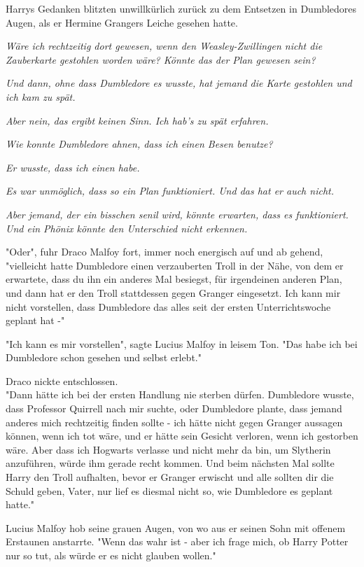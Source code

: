 {Harrys Gedanken blitzten unwillkürlich zurück zu dem Entsetzen in Dumbledores Augen, als er Hermine Grangers Leiche gesehen hatte.

\emph{Wäre ich rechtzeitig dort gewesen, wenn den Weasley-Zwillingen nicht die Zauberkarte gestohlen worden wäre? Könnte das der Plan gewesen sein?}

\emph{Und dann, ohne dass Dumbledore es wusste, hat jemand die Karte gestohlen und ich kam zu spät.}

\emph{Aber nein, das ergibt keinen Sinn. Ich hab's zu spät erfahren.}

\emph{Wie konnte Dumbledore ahnen, dass ich einen Besen benutze?}

\emph{Er wusste, dass ich einen habe.}

\emph{Es war unmöglich, dass so ein Plan funktioniert. Und das hat er auch nicht.}

\emph{Aber jemand, der ein bisschen senil wird, könnte erwarten, dass es funktioniert.}\\ \emph{Und ein Phönix könnte den Unterschied nicht erkennen.}

"Oder", fuhr Draco Malfoy fort, immer noch energisch auf und ab gehend, "vielleicht hatte Dumbledore einen verzauberten Troll in der Nähe, von dem er erwartete, dass du ihn ein anderes Mal besiegst, für irgendeinen anderen Plan, und dann hat er den Troll stattdessen gegen Granger eingesetzt. Ich kann mir nicht vorstellen, dass Dumbledore das alles seit der ersten Unterrichtswoche geplant hat -"

"Ich kann es mir vorstellen", sagte Lucius Malfoy in leisem Ton. "Das habe ich bei Dumbledore schon gesehen und selbst erlebt."

Draco nickte entschlossen.\\ "Dann hätte ich bei der ersten Handlung nie sterben dürfen. Dumbledore wusste, dass Professor Quirrell nach mir suchte, oder Dumbledore plante, dass jemand anderes mich rechtzeitig finden sollte - ich hätte nicht gegen Granger aussagen können, wenn ich tot wäre, und er hätte sein Gesicht verloren, wenn ich gestorben wäre. Aber dass ich Hogwarts verlasse und nicht mehr da bin, um Slytherin anzuführen, würde ihm gerade recht kommen. Und beim nächsten Mal sollte Harry den Troll aufhalten, bevor er Granger erwischt und alle sollten dir die Schuld geben, Vater, nur lief es diesmal nicht so, wie Dumbledore es geplant hatte."

Lucius Malfoy hob seine grauen Augen, von wo aus er seinen Sohn mit offenem Erstaunen anstarrte. "Wenn das wahr ist - aber ich frage mich, ob Harry Potter nur so tut, als würde er es nicht glauben wollen."

}
